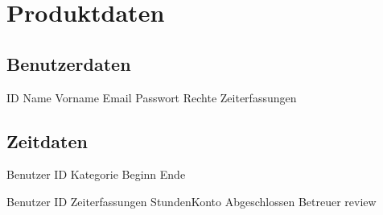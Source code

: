 \section{Produktdaten}

\subsection{Benutzerdaten}
\begin{requirements}
    \begin{requirements}
         ID
         Name
         Vorname
         Email
         Passwort
         Rechte
         Zeiterfassungen
    \end{requirements}
\end{requirements}

\subsection{Zeitdaten}
\begin{requirements}
    \begin{requirements}
         Benutzer ID
         Kategorie
         Beginn
         Ende
    \end{requirements}

    \begin{requirements}
             Benutzer ID
             Zeiterfassungen
             StundenKonto
             Abgeschlossen
             Betreuer review
    \end{requirements}
\end{requirements}


